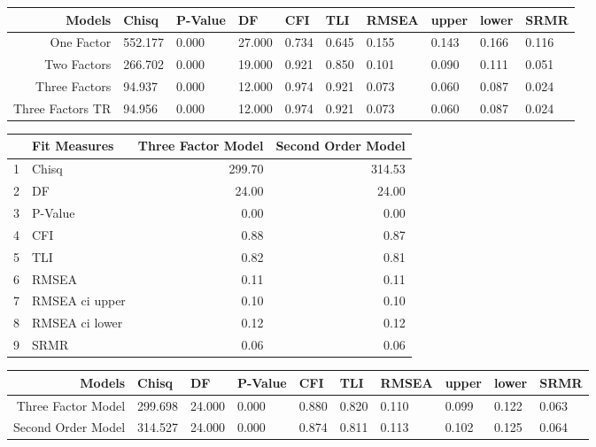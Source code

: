 \documentclass{article}\usepackage[]{graphicx}\usepackage[]{color}
\begin{document}
\begin{table}[ht]
\centering
\begin{tabular}{rlllllllll}
  \hline
Models & Chisq & P-Value & DF & CFI & TLI & RMSEA & upper & lower & SRMR\\ 
  \hline
  One Factor & 552.177 &   0.000 &  27.000 &   0.734 &   0.645 &   0.155 &   0.143 &   0.166 &   0.116 \\ 
  Two Factors & 266.702 &   0.000 &  19.000 &   0.921 &   0.850 &   0.101 &   0.090 &   0.111 &   0.051 \\ 
  Three Factors & 94.937 &  0.000 & 12.000 &  0.974 &  0.921 &  0.073 &  0.060 &  0.087 &  0.024 \\ 
  Three Factors TR & 94.956 &  0.000 & 12.000 &  0.974 &  0.921 &  0.073 &  0.060 &  0.087 &  0.024 \\ 
   \hline
\end{tabular}
\end{table}
\begin{table}[ht]
\centering
\begin{tabular}{rlrr}
  \hline
 & Fit Measures & Three Factor Model & Second Order Model \\ 
  \hline
1 & Chisq & 299.70 & 314.53 \\ 
  2 & DF & 24.00 & 24.00 \\ 
  3 & P-Value & 0.00 & 0.00 \\ 
  4 & CFI & 0.88 & 0.87 \\ 
  5 & TLI & 0.82 & 0.81 \\ 
  6 & RMSEA & 0.11 & 0.11 \\ 
  7 & RMSEA ci upper & 0.10 & 0.10 \\ 
  8 & RMSEA ci lower & 0.12 & 0.12 \\ 
  9 & SRMR & 0.06 & 0.06 \\ 
   \hline
\end{tabular}
\end{table}

\begin{table}[ht]
\centering
\begin{tabular}{rlllllllll}
  \hline
Models & Chisq & DF & P-Value & CFI & TLI & RMSEA & upper & lower & SRMR\\ 
  \hline
  Three Factor Model & 299.698 &  24.000 &   0.000 &   0.880 &   0.820 &   0.110 &   0.099 &   0.122 &   0.063 \\ 
  Second Order Model & 314.527 &  24.000 &   0.000 &   0.874 &   0.811 &   0.113 &   0.102 &   0.125 &   0.064 \\ 
   \hline
\end{tabular}
\end{table}
\end{document}
